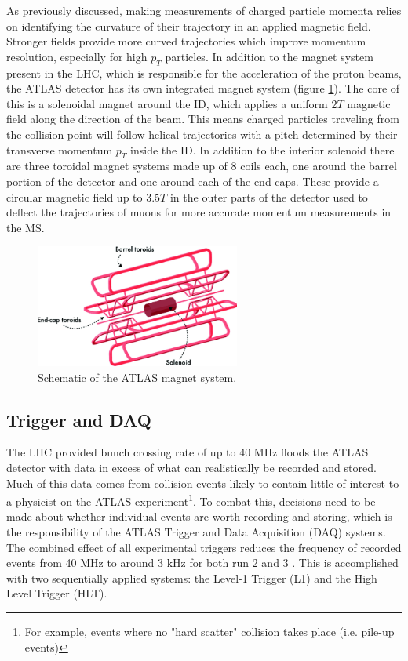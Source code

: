 As previously discussed, making measurements of charged particle momenta relies on identifying the curvature of their 
trajectory in an applied magnetic field. Stronger fields provide more curved trajectories which improve momentum 
resolution, especially for high $p_T$ particles. In addition to the magnet system present in the LHC, which is 
responsible for the acceleration of the proton beams, the ATLAS detector has its own integrated magnet system 
(figure \ref{fig:ATLAS_Magnets}). The core of this is a solenoidal magnet around the ID, which applies a uniform $2T$ 
magnetic field along the direction of the beam. This means charged particles traveling from the collision point will 
follow helical trajectories with a pitch determined by their transverse momentum $p_T$ inside the ID. In addition to 
the interior solenoid there are three toroidal magnet systems made up of 8 coils each, one around the barrel portion 
of the detector and one around each of the end-caps. These provide a circular magnetic field up to $3.5T$ in the outer 
parts of the detector used to deflect the trajectories of muons for more accurate momentum measurements in the MS. \par

\begin{figure}
\centering
    \includegraphics[width=0.6\textwidth]{images/ATLAS_Magnets.png}
    \caption{Schematic of the ATLAS magnet system.}
    \label{fig:ATLAS_Magnets}
\end{figure}

\subsection{Trigger and DAQ}

The LHC provided bunch crossing rate of up to 40 MHz floods the ATLAS detector with data in excess of what can 
realistically be recorded and stored. Much of this data comes from collision events likely to contain little of 
interest to a physicist on the ATLAS experiment\footnote{For example, events where no "hard scatter" collision 
takes place (i.e. pile-up events)}. To combat this, decisions need to be made about whether individual events are 
worth recording and storing, which is the responsibility of the ATLAS Trigger and Data Acquisition (DAQ) systems. The 
combined effect of all experimental triggers reduces the frequency of recorded events from 40 MHz to around 3 kHz 
for both run 2 and 3 \cite{oliveiradamazio-trigger}. This is accomplished with two sequentially applied systems: the 
Level-1 Trigger (L1) and the High Level Trigger (HLT). \par

